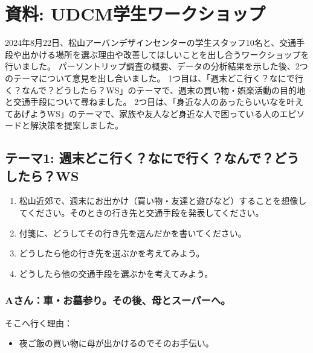 \documentclass[a4paper,12pt, uplatex]{jsbook}
\begin{document}

\chapter{資料: UDCM学生ワークショップ}
2024年8月22日、松山アーバンデザインセンターの学生スタッフ10名と、交通手段や出かける場所を選ぶ理由や改善してほしいことを出し合うワークショップを行いました。
パーソントリップ調査の概要、データの分析結果を示した後、2つのテーマについて意見を出し合いました。
1つ目は、「週末どこ行く？なにで行く？なんで？どうしたら？WS」のテーマで、週末の買い物・娯楽活動の目的地と交通手段について尋ねました。
2つ目は、「身近な人のあったらいいなを叶えてあげようWS」のテーマで、家族や友人など身近な人で困っている人のエピソードと解決策を提案しました。

\section{テーマ1: 週末どこ行く？なにで行く？なんで？どうしたら？WS}
\begin{enumerate}
  \item 松山近郊で、週末にお出かけ（買い物・友達と遊びなど）することを想像してください。そのときの行き先と交通手段を発表してください。
  \item 付箋に、どうしてその行き先を選んだかを書いてください。
  \item どうしたら他の行き先を選ぶかを考えてみよう。
  \item どうしたら他の交通手段を選ぶかを考えてみよう。
\end{enumerate}

\subsection{Aさん：車・お墓参り。その後、母とスーパーへ。}
そこへ行く理由：
\begin{itemize}
  \item 夜ご飯の買い物に母が出かけるのでそのお手伝い。
\end{itemize}
\end{document}
